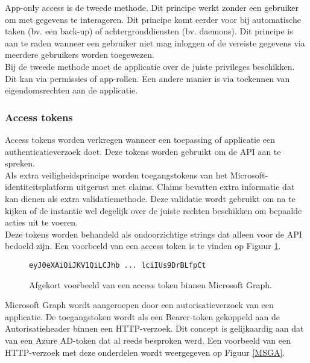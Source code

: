 App-only access is de tweede methode. Dit principe werkt zonder een gebruiker om met gegevens te interageren. Dit principe komt eerder voor bij automatische taken (bv. een back-up) of achtergronddiensten (bv. daemons). Dit principe is aan te raden wanneer een gebruiker niet mag inloggen of de vereiste gegevens via meerdere gebruikers worden toegewezen. \\

Bij de tweede methode moet de applicatie over de juiste privileges beschikken. Dit kan via permissies of app-rollen. Een andere manier is via toekennen van eigendomsrechten aan de applicatie. 

\subsubsection{Access tokens}

Access tokens worden verkregen wanneer een toepassing of applicatie een authenticatieverzoek doet. Deze tokens worden gebruikt om de \ac{API} aan te spreken. \\

Als extra veiligheidsprincipe worden toegangstokens van het Microsoft-\newline
identiteitsplatform uitgerust met claims. Claims bevatten extra informatie dat kan dienen als extra validatiemethode. Deze validatie wordt gebruikt om na te kijken of de instantie wel degelijk over de juiste rechten beschikken om bepaalde acties uit te voeren. \\

Deze tokens worden behandeld als ondoorzichtige strings dat alleen voor de \ac{API} bedoeld zijn. Een voorbeeld van een access token is te vinden op Figuur \ref{MSGAT}. \\

\begin{figure}[h]
    \scriptsize
    \begin{verbatim}        
eyJ0eXAiOiJKV1QiLCJhb ... lciIUs9DrBLfpCt
    \end{verbatim}    
    \caption[Afgekort voorbeeld Microsoft Graph access token]{Afgekort voorbeeld van een access token binnen Microsoft Graph.}
    \label{MSGAT}
\end{figure}

Microsoft Graph wordt aangeroepen door een autorisatieverzoek van een applicatie. De toegangstoken wordt als een Bearer-token gekoppeld aan de Autorisatieheader binnen een \ac{HTTP}-verzoek. Dit concept is gelijkaardig aan dat van een Azure \ac{AD}-token dat al reeds besproken werd. Een voorbeeld van een \ac{HTTP}-verzoek met deze onderdelen wordt weergegeven op Figuur \ref{MSGA}. \\


